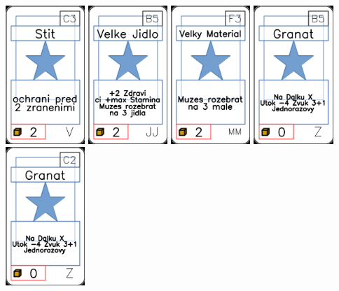 \documentclass[a4paper]{article}
\begin{document}
	\includegraphics[width=3.0cm]{img-1_72}
	\includegraphics[width=3.0cm]{img-1_39}
	\includegraphics[width=3.0cm]{img-1_57}
	\includegraphics[width=3.0cm]{img-1_99}
	\includegraphics[width=3.0cm]{img-1_101}
\end{document}
